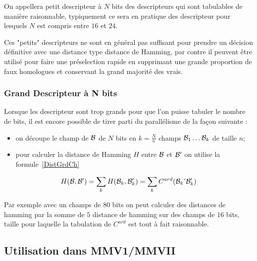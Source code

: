 On appellera petit descripteur \`a $N$ bits des descripteurs qui sont tabulables de mani\`ere raisonnable,
typiquement ce sera en pratique des descripteur pour lesquels $N$ est compris entre $16$ et $24$.

Ces "petits" descripteurs ne sont en g\'en\'eral pas suffisant pour prendre un d\'ecision d\'efinitive
avec une distance type distance de Hamming, par contre il peuvent \^etre utilis\'e pour faire une pr\'eselection
rapide en supprimant une grande proportion de faux homologues et conservant la grand majorit\'e des vrais.

\subsubsection{Grand Descripteur \`a N bits}

Lorsque les descripteur sont trop grands pour que l'on puisse tabuler le nombre de bits,
il est encore possible de tirer parti du parall\'elisme de la fa\c{c}on suivante :

\begin{itemize}
    \item on d\'ecoupe le champ de ${\mathcal B}$ de  $N$ bits en $k=\frac{N}{n}$ champs ${\mathcal B}_1 \dots {\mathcal B}_k$ de
          taille $n$;

     \item pour calculer la distance de Hamming $H$ entre ${\mathcal B}$ et ${\mathcal B}'$ on utilise
           la formule~\ref{DistGrdCh}
\end{itemize}

\begin{equation}
   H({\mathcal B},{\mathcal B}') = \sum_k H({\mathcal B}_k,{\mathcal B}_k') = \sum_k C^{ard}({\mathcal B}_k \hat{~}  {\mathcal B}_k') \label{DistGrdCh}
\end{equation}

Par exemple avec un champs de $80$ bits on peut calculer des distances de hamming par la somme de $5$
distance de hamming sur des champs de $16$ bits, taille pour laquelle la tabulation de $ C^{ard}$
est tout \`a fait raisonnable.


\subsection{Utilisation dans MMV1/MMVII}

